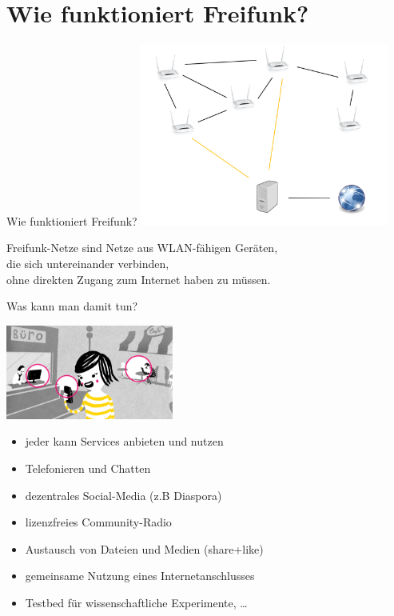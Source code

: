 \documentclass{beamer}
\begin{document}
\section{Wie funktioniert Freifunk?}
\begin{frame}{Wie funktioniert Freifunk?}
\vfill
\centering
\includegraphics[height=6cm]{images/meshing}

Freifunk-Netze sind Netze aus WLAN-fähigen Geräten,\\ die sich untereinander verbinden,\\ ohne direkten Zugang zum Internet haben zu müssen.
\vfill
\end{frame}

\begin{frame}{Was kann man damit tun?}
\vfill
\begin{center}
\includegraphics[width=5.5cm]{images/verbindet}
\end{center}

\begin{itemize}
\pause\item jeder kann Services anbieten und nutzen
\pause\item Telefonieren und Chatten
\pause\item dezentrales Social-Media (z.B Diaspora)
\pause\item lizenzfreies Community-Radio
\pause\item Austausch von Dateien und Medien (share+like)
\pause\item gemeinsame Nutzung eines Internetanschlusses
\pause\item Testbed f\"ur wissenschaftliche Experimente, \ldots
\end{itemize}
\vfill
\end{frame}
\end{document}
